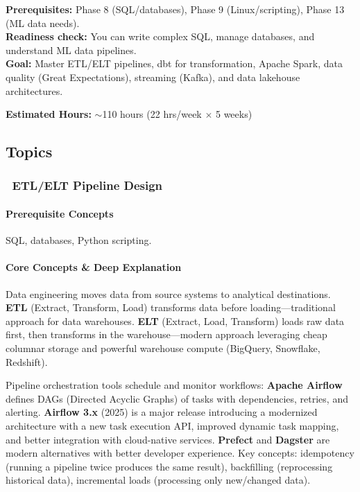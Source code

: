 \documentclass[11pt, a4paper, oneside]{report}
\newcommand{\mustmaster}[1]{\subsubsection{\texorpdfstring{\fcolorbox{blue!40!black}{blue!8}{\footnotesize\bfseries\color{blue!40!black} MUST MASTER}~#1}{#1}}}
\begin{document}
\begin{prereqbox}
\textbf{Prerequisites:} Phase 8 (SQL/databases), Phase 9 (Linux/scripting), Phase 13 (ML data needs).\\
\textbf{Readiness check:} You can write complex SQL, manage databases, and understand ML data pipelines.\\
\textbf{Goal:} Master ETL/ELT pipelines, dbt for transformation, Apache Spark, data quality (Great Expectations), streaming (Kafka), and data lakehouse architectures.


\textbf{Estimated Hours:} $\sim$110 hours (22 hrs/week $\times$ 5 weeks)
\end{prereqbox}

\subsection*{Topics}

\mustmaster{ETL/ELT Pipeline Design}

\paragraph{Prerequisite Concepts} SQL, databases, Python scripting.

\paragraph{Core Concepts \& Deep Explanation} Data engineering moves data from source systems to analytical destinations. \textbf{ETL} (Extract, Transform, Load) transforms data before loading---traditional approach for data warehouses. \textbf{ELT} (Extract, Load, Transform) loads raw data first, then transforms in the warehouse---modern approach leveraging cheap columnar storage and powerful warehouse compute (BigQuery, Snowflake, Redshift).

Pipeline orchestration tools schedule and monitor workflows: \textbf{Apache Airflow} defines DAGs (Directed Acyclic Graphs) of tasks with dependencies, retries, and alerting. \textbf{Airflow 3.x} (2025) is a major release introducing a modernized architecture with a new task execution API, improved dynamic task mapping, and better integration with cloud-native services. \textbf{Prefect} and \textbf{Dagster} are modern alternatives with better developer experience. Key concepts: idempotency (running a pipeline twice produces the same result), backfilling (reprocessing historical data), incremental loads (processing only new/changed data).
\end{document}
